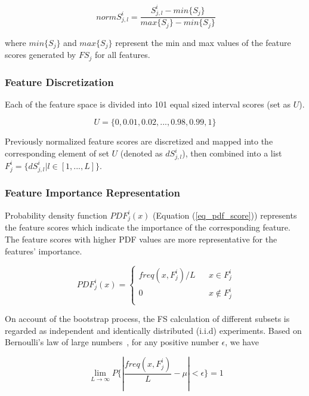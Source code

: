 \documentclass[conference]{IEEEtran}
\begin{document}
\begin{equation}~\label{min_max}
	normS^i_{j, l} = \frac{S^i_{j, l} - min\{S_j\}}{max\{S_j\} - min\{S_j\}}
\end{equation}

\noindent
where $min\{S_j\}$ and $max\{S_j\}$ represent the min and max values of the feature scores generated by $FS_j$ for all features.


\subsubsection{\textbf{Feature Discretization}}
Each of the feature space is divided into 101 equal sized interval scores (set as $U$).

\begin{equation}
	U = \{0, 0.01, 0.02,..., 0.98, 0.99, 1\}
\end{equation}

Previously normalized feature scores are discretized and mapped into the corresponding element of set $U$ (denoted as $dS^i_{j, l}$), then combined into a list $F^i_j = \{ dS^i_{j, l} | l \in [1, ..., L]\}$.

\subsubsection{\textbf{Feature Importance Representation}}
Probability density function $PDF^i_j(x)$ (Equation (\ref{eq_pdf_score})) represents the feature scores which indicate the importance of the corresponding feature. The feature scores with higher PDF values are more representative for the features' importance. 

\begin{equation}~\label{eq_pdf_score}
	PDF^i_j(x)=\left\{
	\begin{array}{rcl}
		freq(x, F^i_j) / L      &      & {x \in   F^i_j}\\
		0     		&      & {x  \notin F^i_j}\\
	\end{array} \right.
\end{equation}

On account of the bootstrap process, the FS calculation of different subsets is regarded as independent and identically distributed (i.i.d) experiments. Based on Bernoulli's law of large numbers~\cite{grimmett2001probability}, for any positive number $\epsilon$, we have

\begin{equation}~\label{large_numbers}
	\lim \limits_{L \rightarrow \infty} P \{ |\frac{freq(x, F^i_j)}{L} - \mu| < \epsilon \} = 1
\end{equation}
\end{document}
